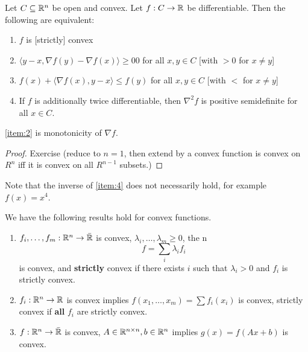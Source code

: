 \begin{thm}
  \label{defn:convexity:6}
  Let $C \subseteq \mathbb{R}^{n}$ be open and convex.  Let $f: C \rightarrow
  \mathbb{R}$ be differentiable. Then the following are equivalent:
  \begin{enumerate}
  \item \label{item:1} $f$ is [strictly] convex
  \item \label{item:2} $\langle y - x, \nabla f(y) - \nabla f(x) \rangle \geq 0 0$ for all
    $x, y \in C$ [with $> 0$ for $x \neq y$]
  \item \label{item:3} $f(x) + \langle \nabla f(x), y - x \rangle \leq f(y)$ for all
    $x, y \in C$ [with $<$ for $x \neq y$]
  \item \label{item:4} If $f$ is additionally twice differentiable, then $\nabla^{2}
    f$ is positive semidefinite for all $x \in C$.
  \end{enumerate}

  \ref{item:2} is monotonicity of $\nabla f$.
\end{thm}

\begin{proof}
  Exercise (reduce to $n=1$, then extend by a convex function is
  convex on $R^{n}$ iff it is convex on all $R^{n-1}$ subsets.)
\end{proof}

\begin{remark}
  Note that the inverse of \ref{item:4} does not necessarily hold, for
  example $f(x) = x^{4}$.
\end{remark}

\begin{proposition} We have the following results hold for convex functions.
  \begin{enumerate}
  \item $f_{i}, \dots, f_{m}: \mathbb{R}^{n} \rightarrow \bar {\mathbb{R}}$ is convex,
    $\lambda_{i}, \dots, \lambda_{m} \geq 0$, the n
    \begin{equation}
      \label{eq:20}
      f = \sum_{i} \lambda_{i} f_{i}
    \end{equation} is convex, and \textbf{strictly} convex if there
    exists $i$ such that $\lambda_{i} > 0$ and $f_{i}$ is strictly convex.
  \item $f_{i}: \mathbb{R}^{n} \rightarrow \mathbb{R}$ is convex implies $f(x_{1},
    \dots, x_{m}) = \sum f_{i}(x_{i})$ is convex, strictly convex if
    \textbf{all} $f_i$ are strictly convex.
  \item $f: \mathbb{R}^{n} \rightarrow \bar {\mathbb{R}}$ is convex, $A \in \mathbb{R}^{n \times
    n}, b \in \mathbb{R}^{n}$ implies $g(x) = f(Ax + b)$ is convex.
  \end{enumerate}
\end{proposition}


